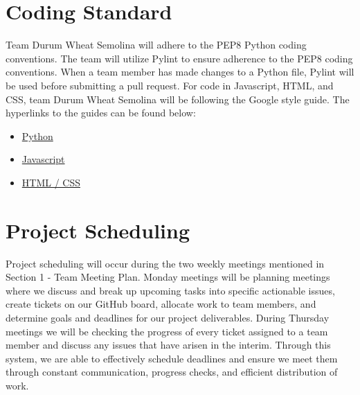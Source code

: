 \documentclass{article}
\begin{document}
\section{Coding Standard}
Team Durum Wheat Semolina will adhere to the PEP8 Python coding conventions. The team will utilize Pylint to ensure adherence to the PEP8 coding conventions. When a team member has made changes to a Python file, Pylint will be used before submitting a pull request. For code in Javascript, HTML, and CSS, team Durum Wheat Semolina will be following the Google style guide. The hyperlinks to the guides can be found below:
\begin{itemize}
	\item \href{https://peps.python.org/pep-0008/}{Python}
	\item \href{https://google.github.io/styleguide/jsguide.html}{Javascript}
	\item \href{https://google.github.io/styleguide/htmlcssguide.html}{HTML / CSS}
\end{itemize}

\section{Project Scheduling}

Project scheduling will occur during the two weekly meetings mentioned in Section 1 - Team Meeting Plan. Monday meetings will be planning meetings where we discuss and break up upcoming tasks into specific actionable issues, create tickets on our GitHub board, allocate work to team members, and determine goals and deadlines for our project deliverables. During Thursday meetings we will be checking the progress of every ticket assigned to a team member and discuss any issues that have arisen in the interim. Through this system, we are able to effectively schedule deadlines and ensure we meet them through constant communication, progress checks, and efficient distribution of work.
\end{document}
